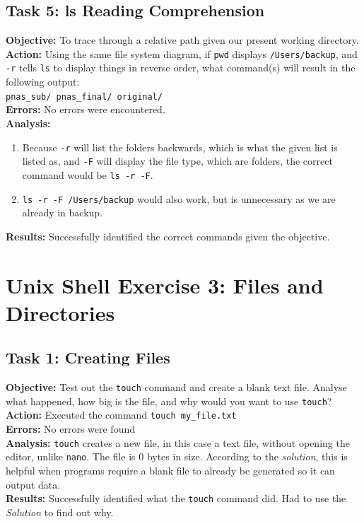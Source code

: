 \documentclass{article}
\begin{document}
\subsection{Task 5: ls Reading Comprehension}
%
\textbf{Objective:} To trace through a relative path given our present working directory.\\
\textbf{Action:} Using the same file system diagram, if \texttt{pwd} displays \texttt{/Users/backup}, and \texttt{-r} tells \texttt{ls} to display things in reverse order, what command(s) will result in the following output:\\
\verb|pnas_sub/ pnas_final/ original/|\\
\textbf{Errors:} No errors were encountered.\\
\textbf{Analysis:} 
\begin{enumerate}
    \item Because \verb|-r| will list the folders backwards, which is what the given list is listed as, and \verb|-F| will display the file type, which are folders, the correct command would be \verb|ls -r -F|. 
    \item \verb|ls -r -F /Users/backup| would also work, but is unnecessary as we are already in backup.
\end{enumerate}
\textbf{Results:} Successfully identified the correct commands given the objective.
\newpage
\section{Unix Shell Exercise 3: Files and Directories}
%
\subsection{Task 1: Creating Files}
%
\textbf{Objective:} Test out the \verb|touch| command and create a blank text file. Analyse what happened, how big is the file, and why would you want to use \verb|touch|?
\textbf{Action:}
Executed the command \verb|touch my_file.txt|\\
\textbf{Errors:} No errors were found\\
\textbf{Analysis:} \verb|touch| creates a new file, in this case a text file, without opening the editor, unlike \verb|nano|. The file is 0 bytes in size. According to the \textit{solution}, this is helpful when programs require a blank file to already be generated so it can output data.\\
\textbf{Results:} Successfully identified what the \verb|touch| command did. Had to use the \textit{Solution} to find out why.
%
\end{document}
